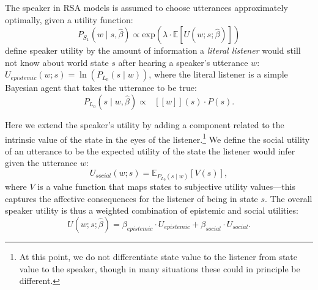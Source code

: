 \documentclass[10pt,letterpaper]{article}
\newcommand{\denote}[1]{\mbox{ $[\![ #1 ]\!]$}}
\newcommand{\ndg}[1]{\textcolor{Green}{[ndg: #1]}}
\begin{document}
The speaker in RSA models is assumed to choose utterances approximately optimally, given a utility function:
\begin{equation}
P_{S_1}(w \mid s, \hat{\beta}) \propto \mathrm{exp}(\lambda \cdot \mathbb{E}[U(w; s;  \hat{\beta})])\label{eq:S1}
\end{equation}
 define speaker utility by the amount of information a \emph{literal listener} would still not know about world state $s$ after hearing a speaker's utterance $w$:
$U_{epistemic}(w; s) = \ln(P_{L_0}(s \mid w)) $,
where the literal listener is a simple Bayesian agent that takes the utterance to be true:
\begin{equation}
P_{L_0}(s \mid w,  \hat{\beta})\propto \denote{w}(s) \cdot P(s) \label{eq:L0}.
\end{equation}

Here we extend the speaker's utility by adding a component related to the intrinsic value of the state in the eyes of the listener.\footnote{At this point, we do not differentiate state value to the listener from state value to the speaker, though in many situations these could in principle be different.}
%
We define the social utility of an utterance to be the expected utility of the state the listener would infer given the utterance $w$:
$$
U_{social}(w; s) = \mathbb{E}_{P_{L_0}(s \mid w)}[V(s)],
$$
%
where $V$ is a value function that maps states to subjective utility values---this captures the affective consequences for the listener of being in state $s$.
The overall speaker utility is thus a weighted combination of epistemic and social utilities:
$$
U(w;s;  \hat{\beta}) = \beta_{epistemic}\cdot U_{epistemic} + \beta_{social} \cdot U_{social}.
$$
%
%
\end{document}
